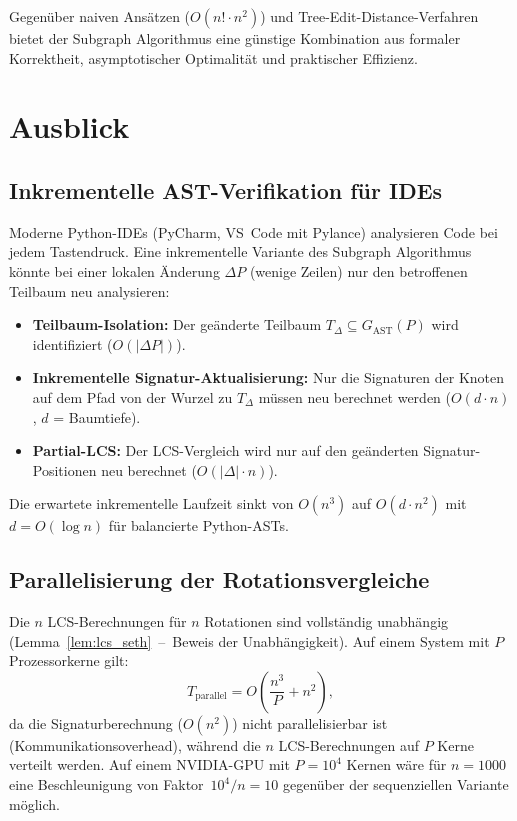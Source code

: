﻿\documentclass[a4paper,12pt]{article}
\theoremstyle{definition}
\begin{document}
Gegen\"uber naiven Ans\"atzen ($O(n! \cdot n^2)$) und
Tree-Edit-Distance-Verfahren bietet der Subgraph Algorithmus
eine g\"unstige Kombination aus formaler Korrektheit,
asymptotischer Optimalit\"at und praktischer Effizienz.

\section{Ausblick}

\subsection{Inkrementelle AST-Verifikation f\"ur IDEs}

Moderne Python-IDEs (PyCharm, VS~Code mit Pylance) analysieren
Code bei jedem Tastendruck.  Eine inkrementelle Variante des
Subgraph Algorithmus k\"onnte bei einer lokalen \"Anderung
$\Delta P$ (wenige Zeilen) nur den betroffenen Teilbaum neu
analysieren:
\begin{itemize}
    \item \textbf{Teilbaum-Isolation:} Der ge\"anderte Teilbaum
          $T_\Delta \subseteq G_{\mathrm{AST}}(P)$ wird
          identifiziert ($O(|\Delta P|)$).
    \item \textbf{Inkrementelle Signatur-Aktualisierung:} Nur
          die Signaturen der Knoten auf dem Pfad von der Wurzel
          zu $T_\Delta$ m\"ussen neu berechnet werden
          ($O(d \cdot n)$, $d$ = Baumtiefe).
    \item \textbf{Partial-LCS:} Der LCS-Vergleich wird nur
          auf den ge\"anderten Signatur-Positionen neu
          berechnet ($O(|\Delta| \cdot n)$).
\end{itemize}
Die erwartete inkrementelle Laufzeit sinkt von $O(n^3)$ auf
$O(d \cdot n^2)$ mit $d = O(\log n)$ f\"ur balancierte
Python-ASTs.

\subsection{Parallelisierung der Rotationsvergleiche}

Die $n$ LCS-Berechnungen f\"ur $n$ Rotationen sind vollst\"andig
unabh\"angig (Lemma~\ref{lem:lcs_seth}~--~Beweis der
Unabh\"angigkeit).  Auf einem System mit $P$ Prozessorkerne
gilt:
\[
T_{\text{parallel}} = O\!\left(\frac{n^3}{P} + n^2\right),
\]
da die Signaturberechnung ($O(n^2)$) nicht parallelisierbar ist
(Kommunikationsoverhead), w\"ahrend die $n$ LCS-Berechnungen
auf $P$ Kerne verteilt werden.  Auf einem NVIDIA-GPU mit
$P = 10^4$ Kernen w\"are f\"ur $n = 1000$ eine Beschleunigung
von Faktor~$10^4 / n = 10$ gegen\"uber der sequenziellen
Variante m\"oglich.
\end{document}
